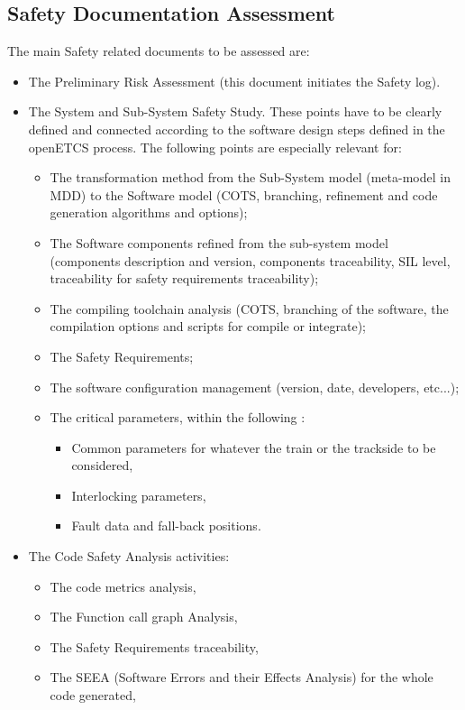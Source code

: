 \documentclass[openetcs]{template/openetcs_article}
\begin{document}
\subsection{Safety Documentation Assessment}
The main Safety related documents to be assessed are:
\begin{itemize}
\item The Preliminary Risk Assessment (this document initiates the Safety log).
\item The System and Sub-System Safety Study. These points have to be clearly defined and connected according to the software design steps defined in the openETCS process. The following points are especially relevant for:
	\begin{itemize}
\item The transformation method from the Sub-System model (meta-model in MDD) to the Software model (COTS, branching, refinement and code generation algorithms
and options);
\item The Software components refined from the sub-system model (components description and version, components traceability, SIL level, traceability for safety
requirements traceability);
	\item The compiling toolchain analysis (COTS, branching of the software, the compilation options and scripts for compile or integrate);
	\item The Safety Requirements;
	\item The software configuration management (version, date, developers, etc...);
	\item The critical parameters, within the following :
		\begin{itemize}
		\item Common parameters for whatever the train or the trackside to be considered,
		\item Interlocking parameters,
		\item Fault data and fall-back positions.
		\end{itemize}
	\end{itemize}
\item The Code Safety Analysis activities:
	\begin{itemize}
	\item The code metrics analysis,
	\item The Function call graph Analysis,
	\item The Safety Requirements traceability,
	\item The SEEA (Software Errors and their Effects Analysis) for the whole code generated,

\end{itemize}
\end{itemize}
\end{document}

